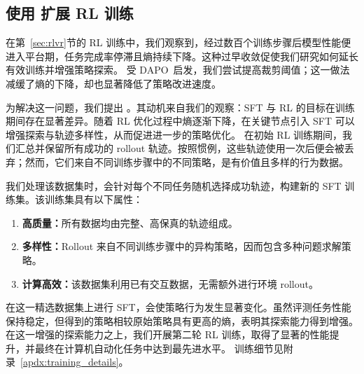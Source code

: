 \subsection{使用 \rlmethod 扩展 RL 训练}\label{sec:rewarm-rl}
在第~\ref{sec:rlvr}节的 RL 训练中，我们观察到，经过数百个训练步骤后模型性能便进入平台期，任务完成率停滞且熵持续下降。这种过早收敛促使我们研究如何延长有效训练并增强策略探索。
受 DAPO~\citep{yu2025dapo}启发，我们尝试提高裁剪阈值；这一做法减缓了熵的下降，却也显著降低了策略改进速度。

为解决这一问题，我们提出 \rlmethod。其动机来自我们的观察：SFT 与 RL 的目标在训练期间存在显著差异。随着 RL 优化过程中熵逐渐下降，在关键节点引入 SFT 可以增强探索与轨迹多样性，从而促进进一步的策略优化。
在初始 RL 训练期间，我们汇总并保留所有成功的 rollout 轨迹。按照惯例，这些轨迹使用一次后便会被丢弃；然而，它们来自不同训练步骤中的不同策略，是有价值且多样的行为数据。

我们处理该数据集时，会针对每个不同任务随机选择成功轨迹，构建新的 SFT 训练集。该训练集具有以下属性：
\begin{enumerate}[leftmargin=1.5em,itemsep=0pt,parsep=0.2em,topsep=0.0em,partopsep=0.0em]
    \item \textbf{高质量：}所有数据均由完整、高保真的轨迹组成。
    \item \textbf{多样性：}Rollout 来自不同训练步骤中的异构策略，因而包含多种问题求解策略。
    \item \textbf{计算高效：}该数据集利用已有交互数据，无需额外进行环境 rollout。
\end{enumerate}

在这一精选数据集上进行 SFT，会使策略行为发生显著变化。虽然评测任务性能保持稳定，但得到的策略相较原始策略具有更高的熵，表明其探索能力得到增强。
在这一增强的探索能力之上，我们开展第二轮 RL 训练，取得了显著的性能提升，并最终在计算机自动化任务中达到最先进水平。
训练细节见附录~\ref{apdx:training_details}。
